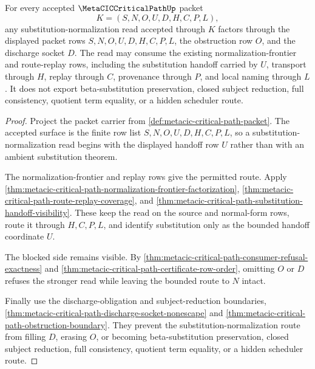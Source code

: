 \begin{theorem}
\label{thm:metacic-critical-path-substitution-normalization-boundary}
For every accepted $\MetaCICCriticalPathUp$ packet
$$
K=(S,N,O,U,D,H,C,P,L),
$$
any substitution-normalization read accepted through $K$ factors through the displayed packet rows $S,N,O,U,D,H,C,P,L$, the obstruction row $O$, and the discharge socket $D$. The read may consume the existing normalization-frontier and route-replay rows, including the substitution handoff carried by $U$, transport through $H$, replay through $C$, provenance through $P$, and local naming through $L$. It does not export beta-substitution preservation, closed subject reduction, full consistency, quotient term equality, or a hidden scheduler route.
\end{theorem}
\begin{proof}
Project the packet carrier from \autoref{def:metacic-critical-path-packet}. The accepted surface is the finite row list $S,N,O,U,D,H,C,P,L$, so a substitution-normalization read begins with the displayed handoff row $U$ rather than with an ambient substitution theorem.

The normalization-frontier and replay rows give the permitted route. Apply \autoref{thm:metacic-critical-path-normalization-frontier-factorization}, \autoref{thm:metacic-critical-path-route-replay-coverage}, and \autoref{thm:metacic-critical-path-substitution-handoff-visibility}. These keep the read on the source and normal-form rows, route it through $H,C,P,L$, and identify substitution only as the bounded handoff coordinate $U$.

The blocked side remains visible. By \autoref{thm:metacic-critical-path-consumer-refusal-exactness} and \autoref{thm:metacic-critical-path-certificate-row-order}, omitting $O$ or $D$ refuses the stronger read while leaving the bounded route to $N$ intact.

Finally use the discharge-obligation and subject-reduction boundaries, \autoref{thm:metacic-critical-path-discharge-socket-nonescape} and \autoref{thm:metacic-critical-path-obstruction-boundary}. They prevent the substitution-normalization route from filling $D$, erasing $O$, or becoming beta-substitution preservation, closed subject reduction, full consistency, quotient term equality, or a hidden scheduler route.
\end{proof}
